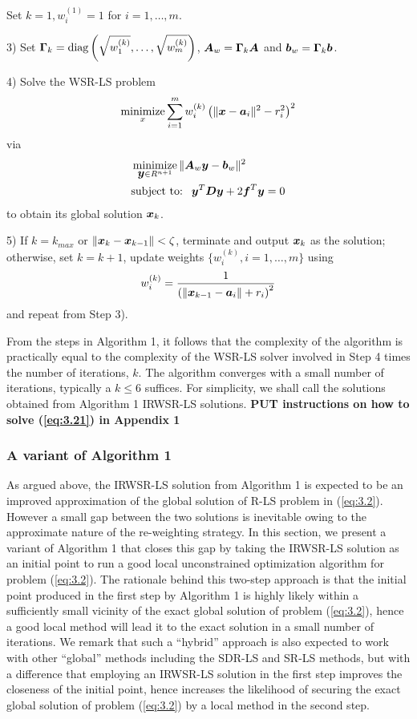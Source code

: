 Set $k=1, w_i^{(1)}=1$ for $i=1,\ldots,m$.

3) Set $\mbox{\boldmath{$\Gamma$}}_k=\mbox{diag}\left(\sqrt{w_1^{(k)}},\ldots,\sqrt{w_m^{(k)}}\right)$, $\mbox{\boldmath$A$}_w=\mbox{\boldmath{$\Gamma$}}_k\mbox{\boldmath$A$}$ and $\mbox{\boldmath$b$}_w=\mbox{\boldmath{$\Gamma$}}_k\mbox{\boldmath$b$}$.

4) Solve the WSR-LS problem 
\begin{equation} 
\nonumber 
\mathop{\mbox{minimize}}_{x} \sum_{i=1}^m w_i^{(k)}\left(\|\mbox{\boldmath$x$}-\mbox{\boldmath$a$}_i\|^2-r_i^2\right)^2
\end{equation}
via
\begin{equation}
\nonumber
\begin{aligned}
&\mathop{\mbox{minimize}}_{{\mbox{\boldmath$y$}} \in R^{n+1}} \|\mbox{\boldmath$A$}_w\mbox{\boldmath$y$}-\mbox{\boldmath$b$}_w\|^2 \\
&\mbox{subject to: \ }  \mbox{\boldmath$y$}^T\mbox{\boldmath$D$}\mbox{\boldmath$y$} + 2\mbox{\boldmath$f$}^T\mbox{\boldmath$y$} = 0
\end{aligned}
\end{equation} 
to obtain its global solution $\mbox{\boldmath$x$}_k$.

5) If $k=k_{max}$ or $\|\mbox{\boldmath$x$}_k-\mbox{\boldmath$x$}_{k-1}\|<\zeta$, terminate and output $\mbox{\boldmath$x$}_k$ as the solution; otherwise, set $k=k+1$, update weights $\{w_i^{(k)}, i=1,\ldots,m\}$ using %
\begin{equation}
\nonumber
w_i^{(k)}=\frac{1}{\left(\|\mbox{\boldmath$x$}_{k-1}-\mbox{\boldmath$a$}_i\|+r_i\right)^2}
\end{equation}
and repeat from Step 3).

From the steps in Algorithm 1, it follows that the complexity of the algorithm is practically equal to the complexity of the WSR-LS solver involved in Step 4 times the number of iterations, $k$. The algorithm converges with a small number of iterations, typically a $k\leq6$  suffices. For simplicity, we shall call the solutions obtained from Algorithm 1 IRWSR-LS solutions.
\textbf{PUT instructions on how to solve (\ref{eq:3.21}) in Appendix 1}

\subsubsection{A variant of Algorithm 1}%

As argued above, the IRWSR-LS solution from Algorithm 1 is expected to be an improved approximation of the global solution of R-LS problem in (\ref{eq:3.2}). However a small gap between the two solutions is inevitable owing to the approximate nature of the re-weighting strategy. In this section, we present a variant of Algorithm 1 that closes this gap by taking the IRWSR-LS solution as an initial point to run a good local unconstrained optimization algorithm for problem (\ref{eq:3.2}).  The rationale behind this two-step approach is that the initial point produced in the first step by Algorithm 1 is highly likely within a sufficiently small vicinity of the exact global solution of problem (\ref{eq:3.2}), hence a good local method will lead it to the exact solution in a small number of iterations. We remark that such a ``hybrid'' approach is also expected to work with other ``global'' methods including the SDR-LS and SR-LS methods, but with a difference that employing an IRWSR-LS solution in the first step improves the closeness of the initial point, hence increases the likelihood of securing the exact global solution of problem (\ref{eq:3.2}) by a local method in the second step.

